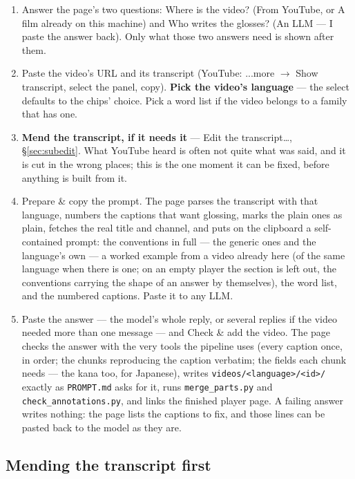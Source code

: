 \documentclass[11pt,oneside]{report}
\newcommand{\file}[1]{\texttt{#1}}
\newcommand{\menu}[1]{\textsf{#1}}
\begin{document}
\begin{enumerate}
\item Answer the page's two questions: \menu{Where is the video?}
  (\menu{From YouTube}, or \menu{A film already on this machine}) and
  \menu{Who writes the glosses?} (\menu{An LLM --- I paste the answer
  back}). Only what those two answers need is shown after them.
\item Paste the video's URL and its transcript (YouTube: \menu{...more
  $\rightarrow$ Show transcript}, select the panel, copy). \textbf{Pick the
  video's language} --- the select defaults to the chips' choice. Pick a
  word list if the video belongs to a family that has one.
\item \textbf{Mend the transcript, if it needs it} ---
  \menu{Edit the transcript\ldots}, \S\ref{sec:subedit}. What YouTube heard
  is often not quite what was said, and it is cut in the wrong places; this
  is the one moment it can be fixed, before anything is built from it.
\item \menu{Prepare \& copy the prompt}. The page parses the transcript with
  that language, numbers the captions that want glossing, marks the plain
  ones as plain, fetches the real title and channel, and puts on the
  clipboard a self-contained prompt: the conventions in full --- the generic
  ones and the language's own --- a worked example from a video already here
  (of the same language when there is one; on an empty player the section is
  left out, the conventions carrying the shape of an answer by themselves),
  the word list, and the numbered captions. Paste it to any LLM.
\item Paste the answer --- the model's whole reply, or several replies if
  the video needed more than one message --- and \menu{Check \& add the
  video}. The
  page checks the answer with the very tools the pipeline uses (every
  caption once, in order; the chunks reproducing the caption verbatim; the
  fields each chunk needs --- the kana too, for Japanese), writes
  \file{videos/<language>/<id>/} exactly as \file{PROMPT.md} asks for it,
  runs \file{merge\_parts.py} and \file{check\_annotations.py}, and links
  the finished player page. A failing answer writes nothing: the page lists
  the captions to fix, and those lines can be pasted back to the model as
  they are.
\end{enumerate}

\subsection*{Mending the transcript first}
\label{sec:subedit}
\end{document}
